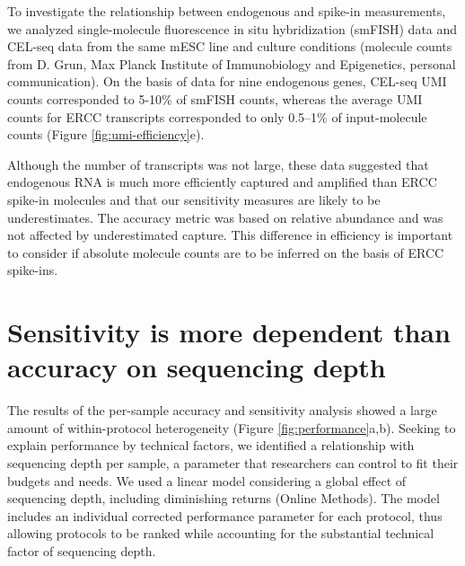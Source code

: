 To investigate the relationship between endogenous and spike-in measurements, we analyzed single-molecule fluorescence in situ hybridization (smFISH) data and CEL-seq data from the same mESC line and culture conditions \cite{Grun2014-fx} (molecule counts from D. Grun, Max Planck Institute of Immunobiology and Epigenetics, personal communication). On the basis of data for nine endogenous genes, CEL-seq UMI counts corresponded to 5-10\% of smFISH counts, whereas the average UMI counts for ERCC transcripts corresponded to only 0.5–1\% of input-molecule counts (Figure \ref{fig:umi-efficiency}e).

Although the number of transcripts was not large, these data suggested that endogenous RNA is much more efficiently captured and amplified than ERCC spike-in molecules and that our sensitivity measures are likely to be underestimates. The accuracy metric was based on relative abundance and was not affected by underestimated capture. This difference in efficiency is important to consider if absolute molecule counts are to be inferred on the basis of ERCC spike-ins.

\section{Sensitivity is more dependent than accuracy on sequencing depth}

The results of the per-sample accuracy and sensitivity analysis showed a large amount of within-protocol heterogeneity (Figure \ref{fig:performance}a,b). Seeking to explain performance by technical factors, we identified a relationship with sequencing depth per sample, a parameter that researchers can control to fit their budgets and needs. We used a linear model considering a global effect of sequencing depth, including diminishing returns (Online Methods). The model includes an individual corrected performance parameter for each protocol, thus allowing protocols to be ranked while accounting for the substantial technical factor of sequencing depth.

